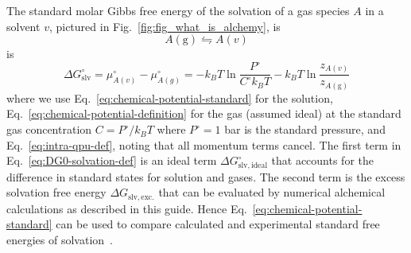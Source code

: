 \documentclass[9pt,bestpractices]{livecoms}
\begin{document}
The standard molar Gibbs free energy of the solvation of a gas species $A$ in a solvent $v$, pictured in Fig.~\ref{fig:fig_what_is_alchemy}, is
\begin{equation}
A(\mathrm{g})  \leftrightharpoons A(v)
\end{equation}
is
\begin{equation}
  \Delta G^\circ_{\mathrm{slv}} = \mu^\circ_{A(v)}  - \mu^\circ_{A(g)} = -k_B T \ln \frac{P^\circ}{C^\circ k_B T} - k_B T \ln \frac{z_{A(v)}}{z_{A(\mathrm{g})}}
  \label{eq:DG0-solvation-def}
\end{equation}
where we use Eq.~\ref{eq:chemical-potential-standard} for the solution, Eq.~\ref{eq:chemical-potential-definition} for the gas (assumed ideal) at the standard gas concentration $C = P^\circ/k_B T$ where $P^\circ = 1$ bar is the standard pressure, and Eq.~\ref{eq:intra-qpu-def}, noting that all momentum terms cancel. The first term in Eq.~\ref{eq:DG0-solvation-def} is an ideal term $\Delta G^\circ_{\mathrm{slv,ideal}}$ that accounts for the difference in standard states for solution and gases. The second term is the excess solvation free energy $\Delta G_{\mathrm{slv, exc.}}$ that can be evaluated by numerical alchemical calculations as described in this guide. Hence Eq.~\ref{eq:chemical-potential-standard} can be used to compare calculated and experimental standard free energies of solvation~\cite{thompson2004new}.
\end{document}
